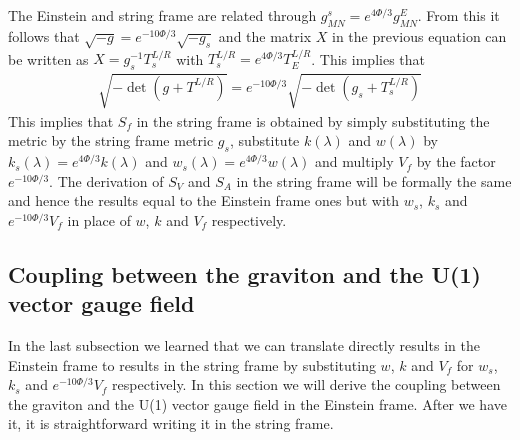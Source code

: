 \documentclass[10 pt]{article}
\begin{document}
The Einstein and string frame are related through $g^s_{MN} = e^{ 4 \Phi / 3}g^{E}_{MN}$. From this it follows that $\sqrt{-g} = e^{- 10 \Phi / 3} \sqrt{-g_s}$ and the matrix $X$ in the previous equation can be written as $X = g_s^{-1} T^{L/R}_s$ with $T^{L/R}_s = e^{4 \Phi / 3} T^{L/R}_E$. This implies that
\begin{align}
\sqrt{-\det \left( g + T^{L/R} \right)} = e^{- 10 \Phi / 3} \sqrt{-\det \left( g_s + T^{L/R}_s \right)}
\end{align}
This implies that $S_f$ in the string frame is obtained by simply substituting the metric by the string frame metric $g_s$, substitute $k\left(\lambda\right)$ and $w\left(\lambda\right)$ by $k_s \left(\lambda\right) = e^{4 \Phi / 3} k\left(\lambda\right) $ and $w_s \left(\lambda\right) = e^{4 \Phi / 3} w\left(\lambda\right) $ and multiply $V_f$ by the factor $e^{-10 \Phi / 3}$. The derivation of $S_V$ and $S_A$ in the string frame will be formally the same and hence the results equal to the Einstein frame ones but with $w_s$, $k_s$ and $e^{-10 \Phi / 3} V_f$ in place of $w$, $k$ and $V_f$ respectively.

\subsection{Coupling between the graviton and the U(1) vector gauge field}
In the last subsection we learned that we can translate directly results in the Einstein frame to results in the string frame by substituting $w$, $k$ and $V_f$ for $w_s$, $k_s$ and $e^{-10 \Phi / 3} V_f$ respectively. In this section we will derive the coupling between the graviton and the U(1) vector gauge field in the Einstein frame. After we have it, it is straightforward writing it in the string frame.
\end{document}
